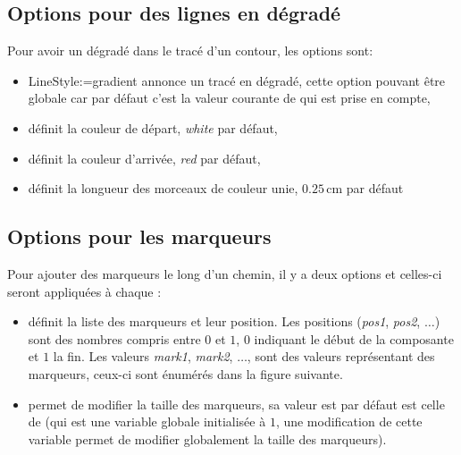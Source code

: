 \subsection{Options pour des lignes en dégradé}\label{gradLines}

Pour avoir un dégradé dans le tracé d'un contour, les options sont:

\begin{itemize}
 \item \textcolor{\coloropt}{LineStyle\string:=gradient} annonce un tracé en dégradé, cette option pouvant être globale car par défaut c'est la valeur courante de  qui est prise en compte,
 \item {} définit la couleur de départ, \emph{white} par défaut,
 \item {} définit la couleur d'arrivée, \emph{red} par défaut,
 \item {} définit la longueur des morceaux de couleur unie, $0.25\,$cm par défaut
\end{itemize}

\subsection{Options pour les marqueurs}\label{marqueurs}

Pour ajouter des marqueurs le long d'un chemin, il y a deux options et celles-ci seront appliquées à chaque :

\begin{itemize}
 \item {} définit la liste des marqueurs et leur position. Les positions (\emph{pos1}, \emph{pos2}, $\ldots$) sont des nombres compris entre $0$ et $1$, $0$ indiquant le début de la composante et $1$ la fin. Les valeurs \emph{mark1}, \emph{mark2}, $\ldots$, sont des valeurs représentant des marqueurs, ceux-ci sont énumérés dans la figure suivante.
 \item {} permet de modifier la taille des marqueurs, sa valeur est par défaut est celle de  (qui est une variable globale initialisée à $1$, une modification de cette variable permet de modifier globalement la taille des marqueurs).
\end{itemize}


